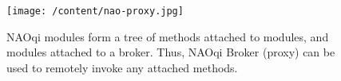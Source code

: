 \begin{figure}
	[h] \centering 
	\texttt{[image: /content/nao-proxy.jpg]} \caption{NAOqi modules form a tree of methods attached to modules, and modules attached to a broker. Thus, NAOqi Broker (proxy) can be used to remotely invoke any attached methods. \cite{8} } \label{fg:nao:proxy} 
\end{figure}
